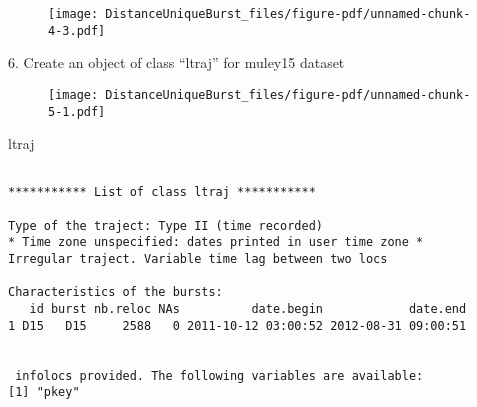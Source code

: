 \documentclass[
  letterpaper,
]{book}
\newenvironment{Shaded}{\begin{snugshade}}{\end{snugshade}}
\newcommand{\AttributeTok}[1]{\textcolor[rgb]{0.40,0.45,0.13}{#1}}
\newcommand{\CommentTok}[1]{\textcolor[rgb]{0.37,0.37,0.37}{#1}}
\newcommand{\FunctionTok}[1]{\textcolor[rgb]{0.28,0.35,0.67}{#1}}
\newcommand{\NormalTok}[1]{\textcolor[rgb]{0.00,0.23,0.31}{#1}}
\newcommand{\OtherTok}[1]{\textcolor[rgb]{0.00,0.23,0.31}{#1}}
\newcommand{\SpecialCharTok}[1]{\textcolor[rgb]{0.37,0.37,0.37}{#1}}
\begin{document}
\begin{figure}[H]

{\centering \texttt{[image: DistanceUniqueBurst\_files/figure-pdf/unnamed-chunk-4-3.pdf]}

}

\end{figure}

6. Create an object of class ``ltraj'' for muley15 dataset

\begin{Shaded}
\end{Shaded}

\begin{figure}[H]

{\centering \texttt{[image: DistanceUniqueBurst\_files/figure-pdf/unnamed-chunk-5-1.pdf]}

}

\end{figure}

\begin{Shaded}
\begin{Highlighting}[]
\NormalTok{ltraj}
\end{Highlighting}
\end{Shaded}

\begin{verbatim}

*********** List of class ltraj ***********

Type of the traject: Type II (time recorded)
* Time zone unspecified: dates printed in user time zone *
Irregular traject. Variable time lag between two locs

Characteristics of the bursts:
   id burst nb.reloc NAs          date.begin            date.end
1 D15   D15     2588   0 2011-10-12 03:00:52 2012-08-31 09:00:51


 infolocs provided. The following variables are available:
[1] "pkey"
\end{verbatim}

\begin{Shaded}
\end{Shaded}
\end{document}
